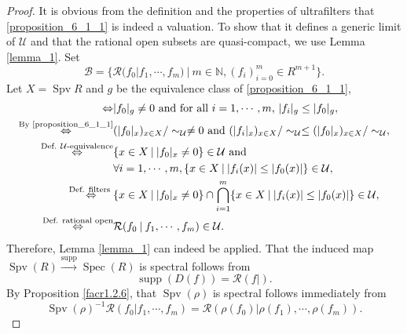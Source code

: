 \documentclass[10pt]{article}
\numberwithin{equation}{section}
\theoremstyle{definition}
\DeclareMathOperator{\supp}{supp}
\DeclareMathOperator{\Spec}{Spec}
\DeclareMathOperator{\Spv}{Spv}
\newcommand{\N}[0]{\mathbb{N}}
\newcommand{\U}[0]{\mathcal{U}}
\newcommand{\cR}[0]{\mathcal{R}}
\newcommand{\sep}[0]{\:|\:}
\newcommand{\ab}[1]{\vert #1 \vert}
\newcommand{\tand}[0]{\text{ and }}
\begin{document}
\begin{proof}
    It is obvious from the definition and the properties of ultrafilters that \eqref{proposition_6_1_1} is indeed a valuation. To show that it defines a generic limit of $\U$ and that the rational open subsets are quasi-compact, we use Lemma \ref{lemma_1}. Set
    \begin{equation*}
        \mathcal{B} = \{\cR(f_0| f_1,\cdots,f_m)\sep m\in\N,(f_i)_{i=0}^m \in R^{m+1}\}.
    \end{equation*}
    Let $X=\Spv R$ and $g$ be the equivalence class of \eqref{proposition_6_1_1},
    \begin{align*}
        [g\in\cR(f_0|f_1,\cdots,f_m)]\Leftrightarrow&\ab{f_0}_g\not=0 \text{ and for all $i=1,\cdots,m$, $\ab{f_i}_g\leq \ab{f_0}_g$},\\
        \stackrel{\text{By \eqref{proposition_6_1_1}}}{\Leftrightarrow}& (\ab{f_0}_x)_{x\in X}/\sim_\U \not=0\text{ and }(\ab{f_i}_x)_{x\in X}/\sim_\U\leq (\ab{f_0}_x)_{x\in X}/\sim_\U,\\
        \stackrel{\substack{\text{Def. $\U$-equivalence}}}{\Leftrightarrow}& \{x\in X\sep \ab{f_0}_x\not=0\}\in\U\tand\\
        &\forall i=1,\cdots,m,\{x\in X\sep \ab{f_i(x)}\leq \vert f_0(x)\vert\}\in\U,\\
        \stackrel{\text{Def. filters }}{\Leftrightarrow}& \{x\in X\sep \ab{f_0}_x\not=0\}\cap\bigcap_{i=1}^m \{x\in X\sep \ab{f_i(x)}\leq\ab{f_0(x)}\}\in\U,\\
        \stackrel{\text{Def. rational open}}{\Leftrightarrow}&\cR(f_0\sep f_1,\cdots,f_m)\in\U.
    \end{align*}
    Therefore, Lemma \ref{lemma_1} can indeed be applied. That the induced map $\Spv(R)\stackrel{\supp}{\to}\Spec(R)$ is spectral follows from
    \begin{equation*}
        \supp(D(f)) = \cR(f|).
    \end{equation*}
    By Proposition \ref{facr1.2.6}, that $\Spv(\rho)$ is spectral follows immediately from
    \begin{equation*}
        \Spv(\rho)^{-1}\cR(f_0|f_1,\cdots,f_m) = \cR(\rho(f_0)|\rho(f_1),\cdots,\rho(f_m)).
    \end{equation*}
\end{proof}
\end{document}
